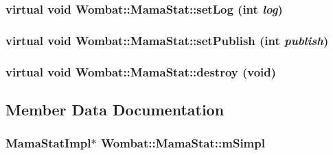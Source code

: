 \label{classWombat_1_1MamaStat_a0ae9a2c4980dc05186e425e27b330fc5}
\hypertarget{classWombat_1_1MamaStat_a8a88566ebc8eeb5ef4a6104d986d76ea}{
\subsubsection[{setLog}]{\setlength{\rightskip}{0pt plus 5cm}virtual void Wombat::MamaStat::setLog (int {\em log})}}
\label{classWombat_1_1MamaStat_a8a88566ebc8eeb5ef4a6104d986d76ea}
\hypertarget{classWombat_1_1MamaStat_ac9e99afa55e2aab193a6df63b2f8292b}{
\subsubsection[{setPublish}]{\setlength{\rightskip}{0pt plus 5cm}virtual void Wombat::MamaStat::setPublish (int {\em publish})}}
\label{classWombat_1_1MamaStat_ac9e99afa55e2aab193a6df63b2f8292b}
\hypertarget{classWombat_1_1MamaStat_abb50ba66e7012112d4370b71d2563bd1}{
\subsubsection[{destroy}]{\setlength{\rightskip}{0pt plus 5cm}virtual void Wombat::MamaStat::destroy (void)}}
\label{classWombat_1_1MamaStat_abb50ba66e7012112d4370b71d2563bd1}


\subsection{Member Data Documentation}
\hypertarget{classWombat_1_1MamaStat_a0cc73961a8457a936d69462ed81994db}{
\subsubsection[{mSimpl}]{\setlength{\rightskip}{0pt plus 5cm}MamaStatImpl$\ast$ {\bf Wombat::MamaStat::mSimpl}}}
\label{classWombat_1_1MamaStat_a0cc73961a8457a936d69462ed81994db}
